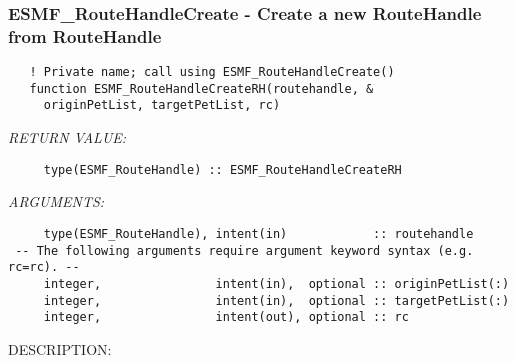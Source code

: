  
\setlength{\oldparskip}{\parskip}
\setlength{\parskip}{1.5ex}
\setlength{\oldparindent}{\parindent}
\setlength{\parindent}{0pt}
\setlength{\oldbaselineskip}{\baselineskip}
\setlength{\baselineskip}{11pt}
 
\def\bv{\begin{verbatim}}
\def\ev{\end{verbatim}}
\def\be{\begin{equation}}
\def\ee{\end{equation}}
\def\bea{\begin{eqnarray}}
\def\eea{\end{eqnarray}}
\def\bi{\begin{itemize}}
\def\ei{\end{itemize}}
\def\bn{\begin{enumerate}}
\def\en{\end{enumerate}}
\def\bd{\begin{description}}
\def\ed{\end{description}}
\def\({\left (}
\def\){\right )}
\def\[{\left [}
\def\]{\right ]}
\def\<{\left  \langle}
\def\>{\right \rangle}
\def\cI{{\cal I}}
\def\diag{\mathop{\rm diag}}
\def\tr{\mathop{\rm tr}}


 
\subsubsection [ESMF\_RouteHandleCreate] {ESMF\_RouteHandleCreate - Create a new RouteHandle from RouteHandle}


 
\begin{verbatim}   ! Private name; call using ESMF_RouteHandleCreate()
   function ESMF_RouteHandleCreateRH(routehandle, &
     originPetList, targetPetList, rc)\end{verbatim}{\em RETURN VALUE:}
\begin{verbatim}     type(ESMF_RouteHandle) :: ESMF_RouteHandleCreateRH\end{verbatim}{\em ARGUMENTS:}
\begin{verbatim}     type(ESMF_RouteHandle), intent(in)            :: routehandle
 -- The following arguments require argument keyword syntax (e.g. rc=rc). --
     integer,                intent(in),  optional :: originPetList(:)
     integer,                intent(in),  optional :: targetPetList(:)
     integer,                intent(out), optional :: rc\end{verbatim}
{\sf DESCRIPTION:\\ }


